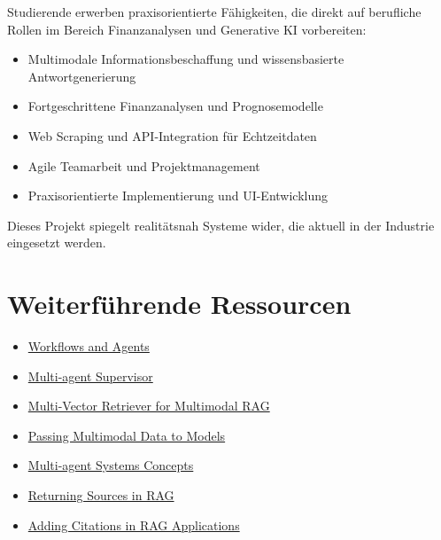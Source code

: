 \documentclass[12pt,a4paper]{article}
\begin{document}
Studierende erwerben praxisorientierte Fähigkeiten, die direkt auf berufliche Rollen im Bereich Finanzanalysen und Generative KI vorbereiten:
\begin{itemize}[noitemsep]
    \item Multimodale Informationsbeschaffung und wissensbasierte Antwortgenerierung
    \item Fortgeschrittene Finanzanalysen und Prognosemodelle
    \item Web Scraping und API-Integration für Echtzeitdaten
    \item Agile Teamarbeit und Projektmanagement
    \item Praxisorientierte Implementierung und UI-Entwicklung
\end{itemize}

Dieses Projekt spiegelt realitätsnah Systeme wider, die aktuell in der Industrie eingesetzt werden.

\section*{Weiterführende Ressourcen}

\begin{itemize}[noitemsep]
    \item \href{https://langchain-ai.github.io/langgraph/tutorials/workflows/}{Workflows and Agents}
    \item \href{https://langchain-ai.github.io/langgraph/tutorials/multi_agent/agent_supervisor/}{Multi-agent Supervisor}
    \item \href{https://blog.langchain.dev/semi-structured-multi-modal-rag/}{Multi-Vector Retriever for Multimodal RAG}
    \item \href{https://python.langchain.com/docs/how_to/multimodal_inputs/}{Passing Multimodal Data to Models}
    \item \href{https://langchain-ai.github.io/langgraph/concepts/multi_agent/}{Multi-agent Systems Concepts}
    \item \href{https://python.langchain.com/docs/how_to/qa_sources/}{Returning Sources in RAG}
    \item \href{https://python.langchain.com/docs/how_to/qa_citations/}{Adding Citations in RAG Applications}
\end{itemize}
\end{document}
